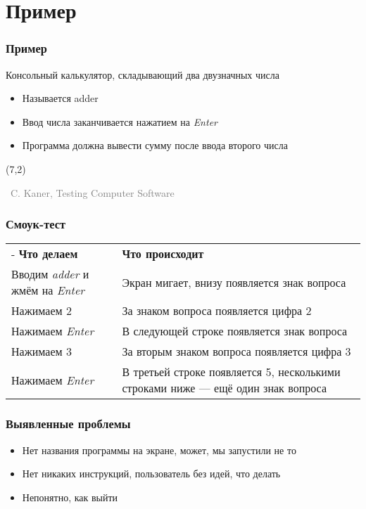 \documentclass[xetex,mathserif,serif]{beamer}
\newcommand{\attribution}[1] {
	\begin{flushright}\begin{scriptsize}\textcolor{gray}{\textcopyright\, #1}\end{scriptsize}\end{flushright}
}
\begin{document}
		\section{Пример}

	\begin{frame}
		\frametitle{Пример}
		Консольный калькулятор, складывающий два двузначных числа
		\begin{itemize}
			\item Называется adder
			\item Ввод числа заканчивается нажатием на \textit{Enter}
			\item Программа должна вывести сумму после ввода второго числа
		\end{itemize}
		\begin{textblock}{5}(7,2)
			\attribution{C. Kaner, Testing Computer Software}
		\end{textblock}
	\end{frame}

	\begin{frame}
		\frametitle{Смоук-тест}
		\begin{center}
			\begin{tabu} {| X[0.6 l p] | X[1 l p] |}
				\tabucline-
				\everyrow{\tabucline-}
				\textbf{Что делаем}                             & \textbf{Что происходит}                                                            \\
				Вводим \textit{adder} и жмём на \textit{Enter}  & Экран мигает, внизу появляется знак вопроса                                        \\
				Нажимаем 2                                      & За знаком вопроса появляется цифра 2                                               \\
				Нажимаем \textit{Enter}                         & В следующей строке появляется знак вопроса                                         \\
				Нажимаем 3                                      & За вторым знаком вопроса появляется цифра 3                                        \\
				Нажимаем \textit{Enter}                         & В третьей строке появляется 5, несколькими строками ниже --- ещё один знак вопроса
			\end{tabu}
		\end{center}
	\end{frame}

	\begin{frame}
		\frametitle{Выявленные проблемы}
		\begin{itemize}
			\item Нет названия программы на экране, может, мы запустили не то
			\item Нет никаких инструкций, пользователь без идей, что делать
			\item Непонятно, как выйти
		\end{itemize}
	\end{frame}
\end{document}

